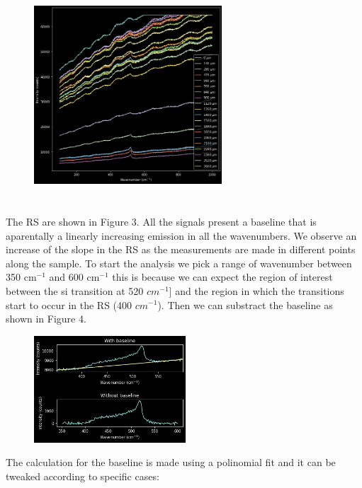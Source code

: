 \documentclass[a4paper,10pt,twocolumn]{article}
\begin{document}
\begin{figure}[h]
  \centering
  \includegraphics[height=8cm, width=7cm]{all_n.png}
\end{figure}


The RS are shown in Figure 3. All the signals present a baseline that is aparentally a linearly increasing emission in all the wavenumbers. We observe an increase of the slope in the RS as the measurements are made in different points along the sample. To start the analysis we pick a range of wavenumber between 350 cm$^{-1}$ and 600 cm$^{-1}$ this is because we can expect the region of interest between the si transition at 520 $cm^{-1}]$ and the region in which the transitions start to occur in the RS (400 $cm^{-1}$). Then we can substract the baseline as shown in Figure 4.

\begin{figure}[h]
  \centering
  \includegraphics[width=0.9\columnwidth, height=4cm]{baseline.png}
\end{figure}

The calculation for the baseline is made using a polinomial fit and it can be tweaked according to specific cases:
\end{document}
